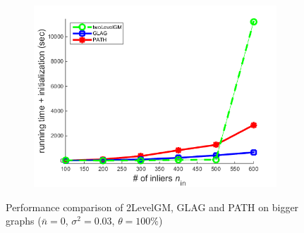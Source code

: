 \begin{figure}[h]
\begin{subfigure}[b]{0.32\textwidth}
			\includegraphics[scale=0.33]{"chapter3/fig/SyntheticTest_BigGraphs/descr/Results_v4.3.3/Test2/time_summary_avg1t"} 
		\end{subfigure} 	
	\caption[Performance comparison of 2LevelGM, GLAG and PATH on bigger graphs: test $2$]{Performance comparison of 2LevelGM, GLAG and PATH on bigger graphs ($\bar{n}=0$, $\sigma^2=0.03$, $\theta=100\%$)}
	\label{fig:synTest2_bigGraphs_ver433}
\end{figure}
